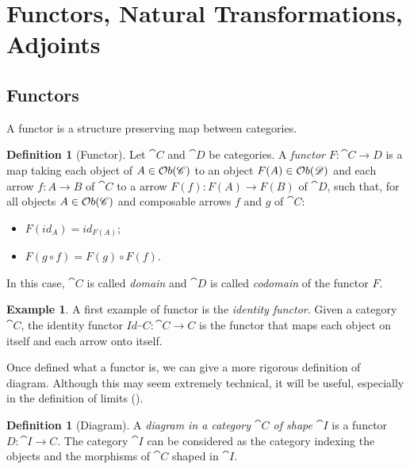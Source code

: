\documentclass[a4paper, twoside,openright]{report}
\theoremstyle{plain}
\theoremstyle{definition}
\newtheorem{definition}[theorem]{Definition}
\newtheorem{example}[theorem]{Example}
\begin{document}
\section{Functors, Natural Transformations, Adjoints}\label{sect:funct_nats}


\subsection{Functors}

A functor is a structure preserving map between categories. 
\begin{definition}[Functor]
    Let $\cat{C}$ and $\cat{D}$ be categories. A \emph{functor} $F:\cat{C \rightarrow D}$ is a map taking each object of $A \in \mathcal{O}b(\mathscr{C})$ to an object $F(A) \in \mathcal{O}b(\mathscr{D})$ and each arrow $f:A\rightarrow B$ of $\cat C$ to a arrow $F(f): F(A) \rightarrow F(B)$ of $\cat D$, such that, for all objects $A \in \mathcal{O}b(\mathscr{C})$ and composable arrows $f$ and $g$ of $\cat C$:
    \begin{itemize}
        \item $F(id_{A}) = id_{F(A)}$;
        \item $F(g \circ f) = F(g) \circ F(f)$.
    \end{itemize}

    In this case, $\cat C$ is called \emph{domain} and $\cat D$ is called \emph{codomain} of the functor $F$.
\end{definition}

\begin{example}
    A first example of functor is the \emph{identity functor}. Given a category $\cat C$, the identity functor $Id_\cat C :\cat{C \rightarrow C}$ is the functor that maps each object on itself and each arrow onto itself. 
\end{example}

Once defined what a functor is, we can give a more rigorous definition of diagram. Although this may seem extremely technical, it will be useful, especially in the definition of limits ().

\begin{definition}[Diagram]\label{def:diagram}
    A \emph{diagram in a category $\cat C$ of shape $\cat I$} is a functor $D: \cat{I \rightarrow C}$.
    The category $\cat I$ can be considered as the category indexing the objects and the morphisms of $\cat C$ shaped in $\cat I$.
\end{definition}
\end{document}
